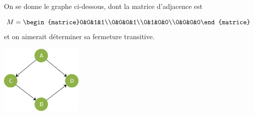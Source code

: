 \begin{methode}
    On se donne le graphe ci-dessous, dont la matrice d'adjacence est
    
    $$M=\begin{matrice}0&0&1&1\\0&0&0&1\\0&1&0&0\\0&0&0&0\end{matrice}$$
    et on aimerait déterminer sa fermeture transitive.
    \begin{center}
        \includegraphics[width=4cm]{graphes/img/fermeture_transitive_0.png}
    \end{center}
    

\end{methode}
